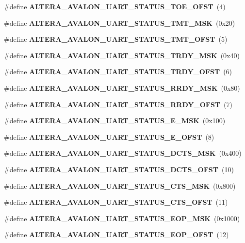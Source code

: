\begin{DoxyCompactItemize}
\#define {\bf A\+L\+T\+E\+R\+A\+\_\+\+A\+V\+A\+L\+O\+N\+\_\+\+U\+A\+R\+T\+\_\+\+S\+T\+A\+T\+U\+S\+\_\+\+T\+O\+E\+\_\+\+O\+F\+ST}~(4)
\item 
\#define {\bf A\+L\+T\+E\+R\+A\+\_\+\+A\+V\+A\+L\+O\+N\+\_\+\+U\+A\+R\+T\+\_\+\+S\+T\+A\+T\+U\+S\+\_\+\+T\+M\+T\+\_\+\+M\+SK}~(0x20)
\item 
\#define {\bf A\+L\+T\+E\+R\+A\+\_\+\+A\+V\+A\+L\+O\+N\+\_\+\+U\+A\+R\+T\+\_\+\+S\+T\+A\+T\+U\+S\+\_\+\+T\+M\+T\+\_\+\+O\+F\+ST}~(5)
\item 
\#define {\bf A\+L\+T\+E\+R\+A\+\_\+\+A\+V\+A\+L\+O\+N\+\_\+\+U\+A\+R\+T\+\_\+\+S\+T\+A\+T\+U\+S\+\_\+\+T\+R\+D\+Y\+\_\+\+M\+SK}~(0x40)
\item 
\#define {\bf A\+L\+T\+E\+R\+A\+\_\+\+A\+V\+A\+L\+O\+N\+\_\+\+U\+A\+R\+T\+\_\+\+S\+T\+A\+T\+U\+S\+\_\+\+T\+R\+D\+Y\+\_\+\+O\+F\+ST}~(6)
\item 
\#define {\bf A\+L\+T\+E\+R\+A\+\_\+\+A\+V\+A\+L\+O\+N\+\_\+\+U\+A\+R\+T\+\_\+\+S\+T\+A\+T\+U\+S\+\_\+\+R\+R\+D\+Y\+\_\+\+M\+SK}~(0x80)
\item 
\#define {\bf A\+L\+T\+E\+R\+A\+\_\+\+A\+V\+A\+L\+O\+N\+\_\+\+U\+A\+R\+T\+\_\+\+S\+T\+A\+T\+U\+S\+\_\+\+R\+R\+D\+Y\+\_\+\+O\+F\+ST}~(7)
\item 
\#define {\bf A\+L\+T\+E\+R\+A\+\_\+\+A\+V\+A\+L\+O\+N\+\_\+\+U\+A\+R\+T\+\_\+\+S\+T\+A\+T\+U\+S\+\_\+\+E\+\_\+\+M\+SK}~(0x100)
\item 
\#define {\bf A\+L\+T\+E\+R\+A\+\_\+\+A\+V\+A\+L\+O\+N\+\_\+\+U\+A\+R\+T\+\_\+\+S\+T\+A\+T\+U\+S\+\_\+\+E\+\_\+\+O\+F\+ST}~(8)
\item 
\#define {\bf A\+L\+T\+E\+R\+A\+\_\+\+A\+V\+A\+L\+O\+N\+\_\+\+U\+A\+R\+T\+\_\+\+S\+T\+A\+T\+U\+S\+\_\+\+D\+C\+T\+S\+\_\+\+M\+SK}~(0x400)
\item 
\#define {\bf A\+L\+T\+E\+R\+A\+\_\+\+A\+V\+A\+L\+O\+N\+\_\+\+U\+A\+R\+T\+\_\+\+S\+T\+A\+T\+U\+S\+\_\+\+D\+C\+T\+S\+\_\+\+O\+F\+ST}~(10)
\item 
\#define {\bf A\+L\+T\+E\+R\+A\+\_\+\+A\+V\+A\+L\+O\+N\+\_\+\+U\+A\+R\+T\+\_\+\+S\+T\+A\+T\+U\+S\+\_\+\+C\+T\+S\+\_\+\+M\+SK}~(0x800)
\item 
\#define {\bf A\+L\+T\+E\+R\+A\+\_\+\+A\+V\+A\+L\+O\+N\+\_\+\+U\+A\+R\+T\+\_\+\+S\+T\+A\+T\+U\+S\+\_\+\+C\+T\+S\+\_\+\+O\+F\+ST}~(11)
\item 
\#define {\bf A\+L\+T\+E\+R\+A\+\_\+\+A\+V\+A\+L\+O\+N\+\_\+\+U\+A\+R\+T\+\_\+\+S\+T\+A\+T\+U\+S\+\_\+\+E\+O\+P\+\_\+\+M\+SK}~(0x1000)
\item 
\#define {\bf A\+L\+T\+E\+R\+A\+\_\+\+A\+V\+A\+L\+O\+N\+\_\+\+U\+A\+R\+T\+\_\+\+S\+T\+A\+T\+U\+S\+\_\+\+E\+O\+P\+\_\+\+O\+F\+ST}~(12)

\end{DoxyCompactItemize}

